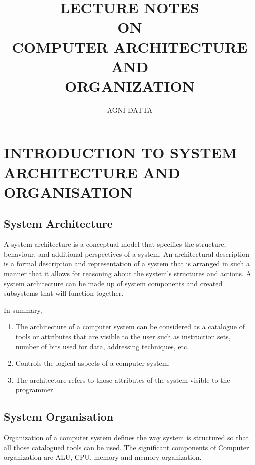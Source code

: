 \documentclass[british]{extreport}
\begin{document}
\title{\noindent \textbf{LECTURE NOTES\\ON\\COMPUTER ARCHITECTURE\\AND\\ORGANIZATION}}
\author{\noindent AGNI DATTA}

\maketitle
\noindent \tableofcontents{}

\chapter{INTRODUCTION TO SYSTEM ARCHITECTURE AND ORGANISATION}

\section{System Architecture}

\noindent A system architecture is a conceptual model that specifies
the structure, behaviour, and additional perspectives of a system.
An architectural description is a formal description and representation
of a system that is arranged in such a manner that it allows for reasoning
about the system's structures and actions. A system architecture can
be made up of system components and created subsystems that will function
together.

\noindent In summary,
\begin{enumerate}
	\item The architecture of a computer system can be considered as a catalogue
	      of tools or attributes that are visible to the user such as instruction
	      sets, number of bits used for data, addressing techniques, etc.
	\item Controls the logical aspects of a computer system.
	\item The architecture refers to those attributes of the system visible
	      to the programmer.
\end{enumerate}

\section{System Organisation}

\noindent Organization of a computer system defines the way system
is structured so that all those catalogued tools can be used. The
significant components of Computer organization are ALU, CPU, memory
and memory organization.
\end{document}
